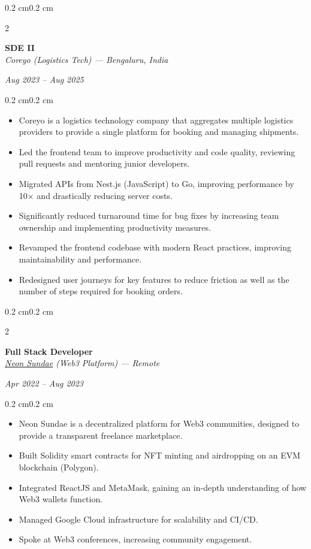\documentclass[10pt, letterpaper]{article}
\newenvironment{highlights}{
    \begin{itemize}[
        topsep=0.10 cm,
        parsep=0.10 cm,
        partopsep=0pt,
        itemsep=0pt,
        leftmargin=0.5 cm
    ]
}{
    \end{itemize}
}
\newenvironment{onecolentry}{
    \begin{adjustwidth}{0.2 cm}{0.2 cm}
}{
    \end{adjustwidth}
}
\newenvironment{twocolentry}[2][]{
    \onecolentry
    \def\secondColumn{#2}
    \setcolumnwidth{\fill, 4.5 cm}
    \begin{paracol}{2}
}{
    \switchcolumn \raggedleft \secondColumn
    \end{paracol}
    \endonecolentry
}
\begin{document}
\begin{twocolentry}{\textit{Aug 2023 -- Aug 2025}}
    \textbf{SDE II} \\
    \textit{Coreyo (Logistics Tech) — Bengaluru, India}
\end{twocolentry}
\begin{onecolentry}
\begin{highlights}
    \item Coreyo is a logistics technology company that aggregates multiple logistics providers to provide a single platform for booking and managing shipments.
    \item Led the frontend team to improve productivity and code quality, reviewing pull requests and mentoring junior developers.
    \item Migrated APIs from Nest.js (JavaScript) to Go, improving performance by 10× and drastically reducing server costs.
    \item Significantly reduced turnaround time for bug fixes by increasing team ownership and implementing productivity measures.
    \item Revamped the frontend codebase with modern React practices, improving maintainability and performance.
    \item Redesigned user journeys for key features to reduce friction as well as the number of steps required for booking orders.
\end{highlights}
\end{onecolentry}

\vspace{0.2cm}

\begin{twocolentry}{\textit{Apr 2022 -- Aug 2023}}
    \textbf{Full Stack Developer} \\
    \textit{\href{https://app.neonsundae.xyz/}{Neon Sundae} (Web3 Platform) — Remote}
\end{twocolentry}
\begin{onecolentry}
\begin{highlights}
    \item Neon Sundae is a decentralized platform for Web3 communities, designed to provide a transparent freelance marketplace.
    \item Built Solidity smart contracts for NFT minting and airdropping on an EVM blockchain (Polygon).
    \item Integrated ReactJS and MetaMask, gaining an in-depth understanding of how Web3 wallets function.
    \item Managed Google Cloud infrastructure for scalability and CI/CD.
    \item Spoke at Web3 conferences, increasing community engagement.
\end{highlights}
\end{onecolentry}
\end{document}
